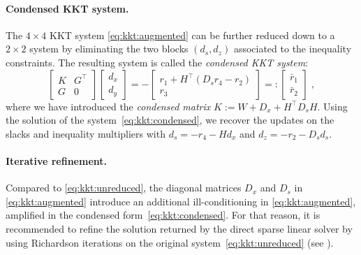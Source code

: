 \paragraph{Condensed KKT system.}
The $4 \times 4$ KKT system \eqref{eq:kkt:augmented} can be further
reduced down to a $2 \times 2$ system by eliminating the two blocks
$(d_s, d_z)$ associated to the inequality constraints.
The resulting system is called the \emph{condensed KKT system}:
\begin{equation}
  \label{eq:kkt:condensed}
  \tag{$K_1$}
  \begin{bmatrix}
    K & G^\top \\
    G & 0
  \end{bmatrix}
  \begin{bmatrix}
    d_x \\ d_y
  \end{bmatrix}
  =
  -
  \begin{bmatrix}
    r_1 + H^\top(D_s r_4 - r_2) \\ r_3
  \end{bmatrix}
  =:
  \begin{bmatrix}
    \bar{r}_1 \\ \bar{r}_2
  \end{bmatrix}
   \; ,
\end{equation}
where we have introduced the \emph{condensed matrix} $K := W + D_x + H^\top D_s H$.
Using the solution of the system~\eqref{eq:kkt:condensed},
we recover the updates on the slacks and inequality multipliers with
$d_s = -r_4 - Hd_x$ and $d_z = -r_2 - D_s d_s$.

\paragraph{Iterative refinement.}
Compared to \eqref{eq:kkt:unreduced},
the diagonal matrices $D_x$ and $D_s$ in \eqref{eq:kkt:augmented} introduce
an additional ill-conditioning in \eqref{eq:kkt:augmented}, amplified
in the condensed form~\eqref{eq:kkt:condensed}. For that reason, it
is recommended to refine the solution returned by the direct sparse linear
solver by using Richardson iterations on the original system~\eqref{eq:kkt:unreduced}
(see \cite[Section 3.10]{wachter2006implementation}).


